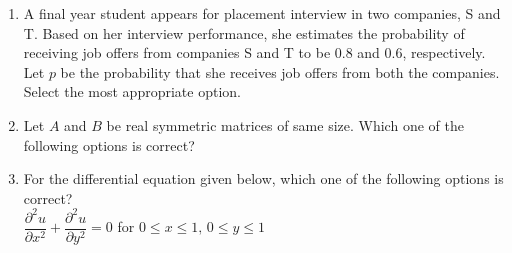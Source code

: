 \documentclass[journal]{IEEEtran}
\begin{document}
\begin{enumerate}[leftmargin=0pt]
\item
A final year student appears for placement interview in two companies, S and T. Based on her interview performance, she estimates the probability of receiving job offers from companies S and T to be $0.8$ and $0.6$, respectively. Let $p$ be the probability that she receives job offers from both the companies. Select the most appropriate option.

\vspace{0.2cm}
\begin{enumerate}
\end{enumerate}
\hfill{}


\item
Let $A$ and $B$ be real symmetric matrices of same size. Which one of the following options is correct?

\vspace{0.2cm}
\begin{enumerate}
\end{enumerate}
\hfill{}

\item
For the differential equation given below, which one of the following options is correct?\\
$\dfrac{\partial^2 u}{\partial x^2} + \dfrac{\partial^2 u}{\partial y^2} = 0$  for $0 \leq x \leq 1,\, 0 \leq y \leq 1$
\vspace{0.2cm}
\begin{enumerate}
\end{enumerate}
\hfill{}


\end{enumerate}
\end{document}
